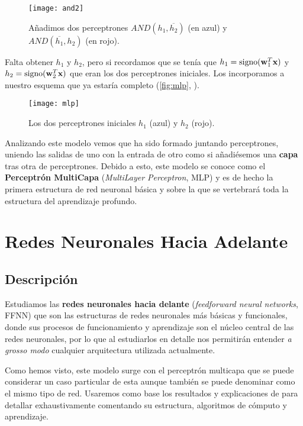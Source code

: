 \begin{figure}[htpb]
  \centering
  \texttt{[image: and2]}
  \caption{Añadimos dos perceptrones $AND(h_1, \overline{h_2})$ (en azul) y $AND(\overline{h_1}, h_2)$ (en rojo).}
  \label{fig:and2}
\end{figure}

Falta obtener $h_1$ y $h_2$, pero si recordamos que se tenía que $h_1 = \operatorname{signo}(\textbf{w}^T_1 \textbf{x})$ y $h_2 = \operatorname{signo}(\textbf{w}^T_2 \textbf{x})$ que eran los dos perceptrones iniciales. Los incorporamos a nuestro esquema que ya estaría completo (\autoref{fig:mlp}, \cite{abu2012learning}).

\begin{figure}[htpb]
  \centering
  \texttt{[image: mlp]}
  \caption{Los dos perceptrones iniciales $h_1$ (azul) y $h_2$ (rojo).}
  \label{fig:mlp}
\end{figure}

Analizando este modelo vemos que ha sido formado juntando perceptrones, uniendo las salidas de uno con la entrada de otro como si añadiésemos una \textbf{capa} tras otra de perceptrones. Debido a esto, este modelo se conoce como el \textbf{Perceptrón MultiCapa} (\emph{MultiLayer Perceptron}, MLP) \cite{rumelhart1985learning} y es de hecho la primera estructura de red neuronal básica y sobre la que se vertebrará toda la estructura del aprendizaje profundo.

\section{Redes Neuronales Hacia Adelante}

\subsection{Descripción}

Estudiamos las \textbf{redes neuronales hacia delante} (\emph{feedforward neural networks}, FFNN) que son las estructuras de redes neuronales más básicas y funcionales, donde sus procesos de funcionamiento y aprendizaje son el núcleo central de las redes neuronales, por lo que al estudiarlos en detalle nos permitirán entender \emph{a grosso modo} cualquier arquitectura utilizada actualmente.

Como hemos visto, este modelo surge con el perceptrón multicapa que se puede considerar un caso particular de esta aunque también se puede denominar como el mismo tipo de red. Usaremos como base los resultados y explicaciones de \cite{abu2012learning} para detallar exhaustivamente comentando su estructura, algoritmos de cómputo y aprendizaje.

